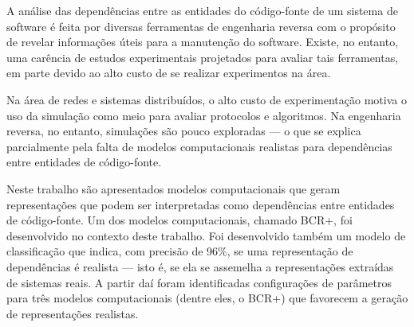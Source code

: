 
A análise das dependências entre as entidades do código-fonte de um sistema de software é feita por diversas ferramentas de engenharia reversa com o propósito de revelar informações úteis para a manutenção do software. Existe, no entanto, uma carência de estudos experimentais projetados para avaliar tais ferramentas, em parte devido ao alto custo de se realizar experimentos na área. 

Na área de redes e sistemas distribuídos, o alto custo de experimentação motiva o uso da simulação como meio para avaliar protocolos e algoritmos. Na engenharia reversa, no entanto, simulações são pouco exploradas --- o que se explica parcialmente pela falta de modelos computacionais realistas para dependências entre entidades de código-fonte.

Neste trabalho são apresentados modelos computacionais que geram representações que podem ser interpretadas como dependências entre entidades de código-fonte. Um dos modelos computacionais, chamado BCR+, foi desenvolvido no contexto deste trabalho. Foi desenvolvido também um modelo de classificação que indica, com precisão de 96\%, se uma representação de dependências é realista --- isto é, se ela se assemelha a representações extraídas de sistemas reais. A partir daí foram identificadas configurações de parâmetros para três modelos computacionais (dentre eles, o BCR+) que favorecem a geração de representações realistas.


